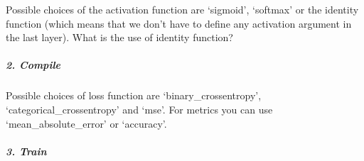 \documentclass[]{article}
\newenvironment{Shaded}{\begin{snugshade}}{\end{snugshade}}
\newcommand{\CommentTok}[1]{\textcolor[rgb]{0.56,0.35,0.01}{\textit{#1}}}
\newcommand{\DataTypeTok}[1]{\textcolor[rgb]{0.13,0.29,0.53}{#1}}
\newcommand{\DecValTok}[1]{\textcolor[rgb]{0.00,0.00,0.81}{#1}}
\newcommand{\FloatTok}[1]{\textcolor[rgb]{0.00,0.00,0.81}{#1}}
\newcommand{\KeywordTok}[1]{\textcolor[rgb]{0.13,0.29,0.53}{\textbf{#1}}}
\newcommand{\NormalTok}[1]{#1}
\newcommand{\OperatorTok}[1]{\textcolor[rgb]{0.81,0.36,0.00}{\textbf{#1}}}
\newcommand{\StringTok}[1]{\textcolor[rgb]{0.31,0.60,0.02}{#1}}
\let\oldsubparagraph\subparagraph
\renewcommand{\subparagraph}[1]{\oldsubparagraph{#1}\mbox{}}
\begin{document}
\begin{Shaded}
\end{Shaded}

Possible choices of the activation function are `sigmoid', `softmax' or
the identity function (which means that we don't have to define any
activation argument in the last layer). What is the use of identity
function?

\hypertarget{compile}{%
\subparagraph{2. Compile}\label{compile}}

\begin{Shaded}
\end{Shaded}

Possible choices of loss function are `binary\_crossentropy',
`categorical\_crossentropy' and `mse'. For metrics you can use
`mean\_absolute\_error' or `accuracy'.

\hypertarget{train}{%
\subparagraph{3. Train}\label{train}}

\begin{Shaded}
\end{Shaded}
\end{document}
